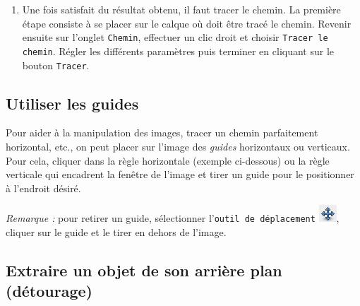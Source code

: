 \begin{enumerate}
\item Une fois satisfait du résultat obtenu, il faut tracer le chemin. La première étape consiste à se placer sur le calque où doit être tracé le chemin. Revenir ensuite sur l'onglet \texttt{Chemin}, effectuer un clic droit et choisir \texttt{Tracer le chemin}. Régler les différents paramètres puis terminer en cliquant sur le bouton \texttt{Tracer}. 




\end{enumerate}

\subsection{Utiliser les guides}\label{Gimp3guide} 
Pour aider à la manipulation des images, tracer un chemin parfaitement horizontal, etc., on peut placer sur l'image des \emph{guides} horizontaux ou verticaux. Pour cela, cliquer dans la règle horizontale (exemple ci-dessous) ou la règle verticale qui encadrent la fenêtre de l'image et tirer un guide pour le positionner à l'endroit désiré.

%

\emph{Remarque :} pour retirer un guide, sélectionner l'\texttt{outil de déplacement} \includegraphics[width=.6cm]{./images/image03/iconeDeplace}, cliquer sur le guide et le tirer en dehors de l'image. 

\subsection{Extraire un objet de son arrière plan (détourage)}\label{Gimp3detourage} 

